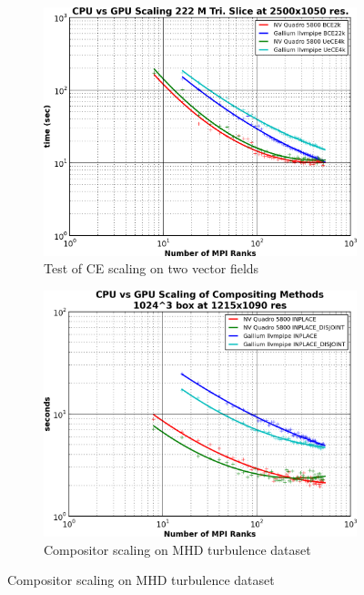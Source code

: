 \documentclass[a4paper,10pt]{article}
\begin{document}
\begin{figure}[h]
 \centering
\begin{subfigure}{0.45\textwidth}
 \includegraphics[width=1.0\textwidth]{./scaling-ce-slice-gpu.png}
 \caption{Test of CE scaling on two vector fields}
 \label{fig:ce-scaling}
\end{subfigure}
\hspace{0.1in}
\begin{subfigure}{0.45\textwidth}
 \centering
 \includegraphics[width=1.0\textwidth]{./scaling-composite-cube-gpu.png}
 \caption{Compositor scaling on MHD turbulence dataset}
 \label{fig:comp-scaling}
\end{subfigure}
\end{figure}
\end{document}
